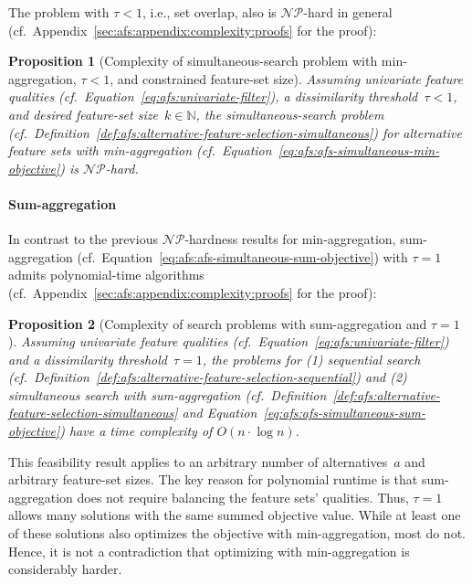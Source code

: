 \documentclass{article}
\newtheorem{proposition}{Proposition}
\theoremstyle{definition}
\begin{document}
The problem with $\tau < 1$, i.e., set overlap, also is $\mathcal{NP}$-hard in general (cf.~Appendix~\ref{sec:afs:appendix:complexity:proofs} for the proof):
%
\begin{proposition}[Complexity of simultaneous-search problem with min-aggregation, $\tau < 1$, and constrained feature-set size]
	Assuming univariate feature qualities (cf.~Equation~\ref{eq:afs:univariate-filter}), a dissimilarity threshold~$\tau < 1$, and desired feature-set size~$k \in \mathbb{N}$, the simultaneous-search problem (cf.~Definition~\ref{def:afs:alternative-feature-selection-simultaneous}) for alternative feature sets with min-aggregation (cf.~Equation~\ref{eq:afs:afs-simultaneous-min-objective}) is $\mathcal{NP}$-hard.
	\label{prop:afs:complexity-no-partitioning-min-constrained-k}
\end{proposition}

\paragraph{Sum-aggregation}

In contrast to the previous $\mathcal{NP}$-hardness results for min-aggregation, sum-aggregation (cf.~Equation~\ref{eq:afs:afs-simultaneous-sum-objective}) with $\tau=1$ admits polynomial-time algorithms (cf.~Appendix~\ref{sec:afs:appendix:complexity:proofs} for the proof):
%
\begin{proposition}[Complexity of search problems with sum-aggregation and $\tau=1$]
	Assuming univariate feature qualities (cf.~Equation~\ref{eq:afs:univariate-filter}) and a dissimilarity threshold~$\tau = 1$, the problems for (1) sequential search (cf.~Definition~\ref{def:afs:alternative-feature-selection-sequential}) and (2) simultaneous search with sum-aggregation (cf.~Definition~\ref{def:afs:alternative-feature-selection-simultaneous} and Equation~\ref{eq:afs:afs-simultaneous-sum-objective}) have a time complexity of $O(n \cdot \log n)$.
	\label{prop:afs:complexity-partitioning-sum}
\end{proposition}
%
This feasibility result applies to an arbitrary number of alternatives~$a$ and arbitrary feature-set sizes.
The key reason for polynomial runtime is that sum-aggregation does not require balancing the feature sets' qualities.
Thus, $\tau=1$ allows many solutions with the same summed objective value.
While at least one of these solutions also optimizes the objective with min-aggregation, most do not.
Hence, it is not a contradiction that optimizing with min-aggregation is considerably harder.
\end{document}

